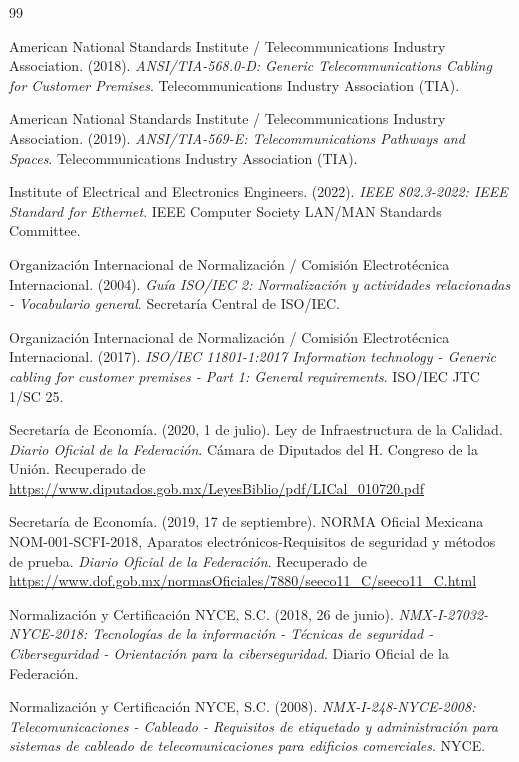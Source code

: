 \documentclass[a4paper,12pt]{article}
\begin{document}
\newpage
\renewcommand{\refname}{Referencias Bibliográficas}
\begin{thebibliography}{99}

American National Standards Institute / Telecommunications Industry Association. (2018). \textit{ANSI/TIA-568.0-D: Generic Telecommunications Cabling for Customer Premises}. Telecommunications Industry Association (TIA).

American National Standards Institute / Telecommunications Industry Association. (2019). \textit{ANSI/TIA-569-E: Telecommunications Pathways and Spaces}. Telecommunications Industry Association (TIA).

Institute of Electrical and Electronics Engineers. (2022). \textit{IEEE 802.3-2022: IEEE Standard for Ethernet}. IEEE Computer Society LAN/MAN Standards Committee.

Organización Internacional de Normalización / Comisión Electrotécnica Internacional. (2004). \textit{Guía ISO/IEC 2: Normalización y actividades relacionadas - Vocabulario general}. Secretaría Central de ISO/IEC.

Organización Internacional de Normalización / Comisión Electrotécnica Internacional. (2017). \textit{ISO/IEC 11801-1:2017 Information technology - Generic cabling for customer premises - Part 1: General requirements}. ISO/IEC JTC 1/SC 25.

Secretaría de Economía. (2020, 1 de julio). Ley de Infraestructura de la Calidad. \textit{Diario Oficial de la Federación}. Cámara de Diputados del H. Congreso de la Unión. Recuperado de \url{https://www.diputados.gob.mx/LeyesBiblio/pdf/LICal_010720.pdf}

Secretaría de Economía. (2019, 17 de septiembre). NORMA Oficial Mexicana NOM-001-SCFI-2018, Aparatos electrónicos-Requisitos de seguridad y métodos de prueba. \textit{Diario Oficial de la Federación}. Recuperado de \url{https://www.dof.gob.mx/normasOficiales/7880/seeco11_C/seeco11_C.html}

Normalización y Certificación NYCE, S.C. (2018, 26 de junio). \textit{NMX-I-27032-NYCE-2018: Tecnologías de la información - Técnicas de seguridad - Ciberseguridad - Orientación para la ciberseguridad}. Diario Oficial de la Federación.

Normalización y Certificación NYCE, S.C. (2008). \textit{NMX-I-248-NYCE-2008: Telecomunicaciones - Cableado - Requisitos de etiquetado y administración para sistemas de cableado de telecomunicaciones para edificios comerciales}. NYCE.

\end{thebibliography}
\end{document}
